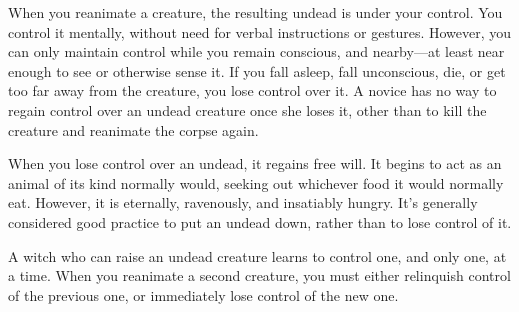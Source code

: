 When you reanimate a creature, the resulting undead is under your control.
You control it mentally, without need for verbal instructions or gestures.
However, you can only maintain control while you remain conscious, and nearby---at least near enough to see or otherwise sense it.
If you fall asleep, fall unconscious, die, or get too far away from the creature, you lose control over it.
A novice  has no way to regain control over an undead creature once she loses it, other than to kill the creature and reanimate the corpse again.

When you lose control over an undead, it regains free will.
It begins to act as an animal of its kind normally would, seeking out whichever food it would normally eat.
However, it is eternally, ravenously, and insatiably hungry.
It's generally considered good practice to put an undead down, rather than to lose control of it.

A witch who can raise an undead creature learns to control one, and only one, at a time.
When you reanimate a second creature, you must either relinquish control of the previous one, or immediately lose control of the new one.


